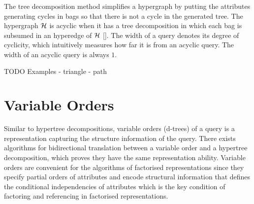 The tree decomposition method simplifies a hypergraph by putting the attributes generating cycles in bags so that there is not a cycle in the generated tree. The hypergraph $\mathcal{H}$ is acyclic when it has a tree decomposition in which each bag is subsumed in an hyperedge of $\mathcal{H}$ []. The width of a query denotes its degree of cyclicity, which intuitively measures how far it is from an acyclic query. The width of an acyclic query is always $1$.  


TODO
Examples 
- triangle
- path


\section{Variable Orders}


















Similar to hypertree decompositions, variable orders (d-trees) of a query is a representation capturing the structure information of the query. There exists algorithms for bidirectional translation between a variable order and a hypertree decomposition, which proves they have the same representation ability. Variable orders are convenient for the algorithms of factorised representations since they specify partial orders of attributes and encode structural information that defines the conditional independencies of attributes which is the key condition of factoring and referencing in factorised representations.  

